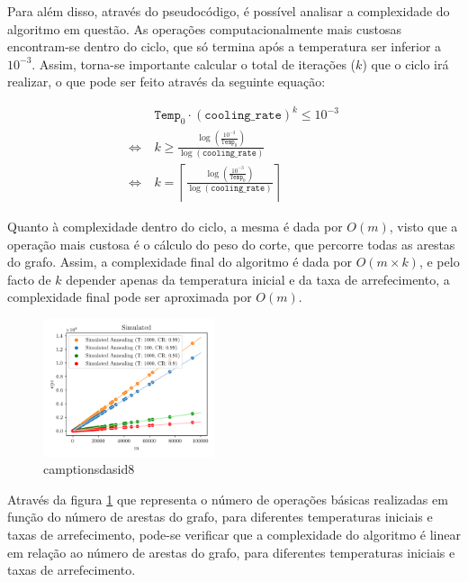 \documentclass[mirror, portugues]{revdetua}
\begin{document}
Para além disso, através do pseudocódigo, é possível analisar a complexidade do algoritmo em questão. As operações computacionalmente mais custosas encontram-se dentro do ciclo, que só termina após a temperatura ser inferior a $10^{-3}$. Assim, torna-se importante calcular o total de iterações ($k$) que o ciclo irá realizar, o que pode ser feito através da seguinte equação:

\begin{align*}
    &\texttt{Temp}_0 \cdot (\texttt{cooling\_rate})^k \le 10^{-3} \\
    \Leftrightarrow\ &  k \geq  \frac{\log\left(\frac{10^{-3}}{\texttt{Temp}_0}\right)}{\log(\texttt{cooling\_rate})} \\
    \Leftrightarrow\ & k = \left\lceil \frac{\log\left(\frac{10^{-3}}{\texttt{Temp}_0}\right)}{\log(\texttt{cooling\_rate})} \right\rceil
\end{align*}

\noindent Quanto à complexidade dentro do ciclo, a mesma é dada por $O(m)$, visto que a operação mais custosa é o cálculo do peso do corte, que percorre todas as arestas do grafo. Assim, a complexidade final do algoritmo é dada por $O(m \times k)$, e pelo facto de $k$ depender apenas da temperatura inicial e da taxa de arrefecimento, a complexidade final pode ser aproximada por $O(m)$.


\begin{figure}[H]
    \centering
    \includegraphics[width=0.45\textwidth]{../assets/ops_Simulated .png}
    \caption{camptionsdasid8}
    \label{fig:sa_ops}
\end{figure}


Através da figura \ref{fig:sa_ops} que representa o número de operações básicas realizadas em função do número de arestas do grafo, para diferentes temperaturas iniciais e taxas de arrefecimento, pode-se verificar que a complexidade do algoritmo é linear em relação ao número de arestas do grafo, para diferentes temperaturas iniciais e taxas de arrefecimento.

\end{document}
